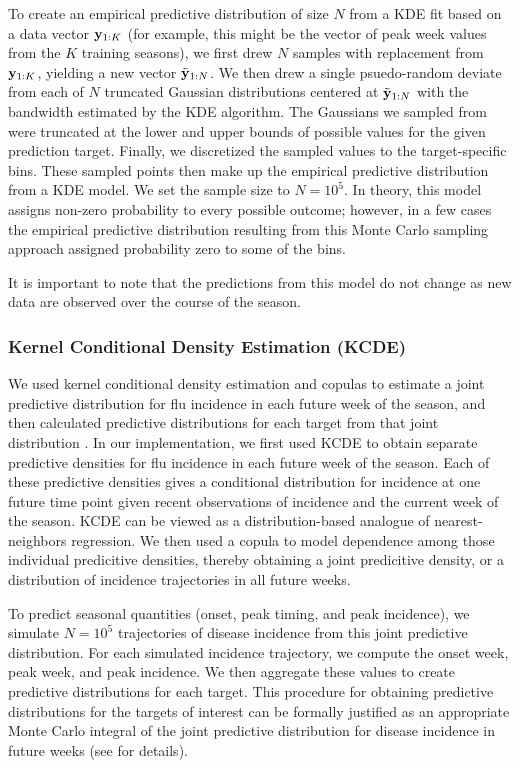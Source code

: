 \documentclass[10pt,letterpaper]{article}
\begin{document}
To create an empirical predictive distribution of size \(N\) from a KDE
fit based on a data vector \({\bf y}_{1:K}\) (for example, this might be the
vector of peak week values from the \(K\) training seasons), we first
drew \(N\) samples with replacement from \({\bf y}_{1:K}\), yielding a new
vector \(\tilde {{\bf y}}_{1:N}\). We then drew a single psuedo-random deviate
from each of \(N\) truncated Gaussian distributions centered at
\(\tilde {{\bf y}}_{1:N}\) with the bandwidth estimated by the KDE algorithm.
The Gaussians we sampled from were truncated at the lower and upper
bounds of possible values for the given prediction target. Finally, we
discretized the sampled values to the target-specific bins. These
sampled points then make up the empirical predictive distribution from a
KDE model. We set the sample size to \(N = 10^5\). In theory, this model
assigns non-zero probability to every possible outcome; however, in a
few cases the empirical predictive distribution resulting from this
Monte Carlo sampling approach assigned probability zero to some of the
bins.

It is important to note that the predictions from this model do not
change as new data are observed over the course of the season.

\subsubsection{Kernel Conditional Density Estimation
(KCDE)}\label{kernel-conditional-density-estimation-kcde}

We used kernel conditional density estimation and copulas to estimate a
joint predictive distribution for flu incidence in each future week of
the season, and then calculated predictive distributions for each target
from that joint distribution
\cite{ReichLabGitHubDiseasePredWithKCDEPackage}. In our implementation,
we first used KCDE to obtain separate predictive densities for flu
incidence in each future week of the season. Each of these predictive
densities gives a conditional distribution for incidence at one future
time point given recent observations of incidence and the current week
of the season. KCDE can be viewed as a distribution-based analogue of
nearest-neighbors regression. We then used a copula to model dependence
among those individual predicitive densities, thereby obtaining a joint
predicitive density, or a distribution of incidence trajectories in all
future weeks.

To predict seasonal quantities (onset, peak timing, and peak incidence),
we simulate \(N = 10^5\) trajectories of disease incidence from this
joint predictive distribution. For each simulated incidence trajectory,
we compute the onset week, peak week, and peak incidence. We then
aggregate these values to create predictive distributions for each
target. This procedure for obtaining predictive distributions for the
targets of interest can be formally justified as an appropriate Monte
Carlo integral of the joint predictive distribution for disease
incidence in future weeks (see
\cite{ReichLabGitHubDiseasePredWithKCDEPackage} for details).
\end{document}
